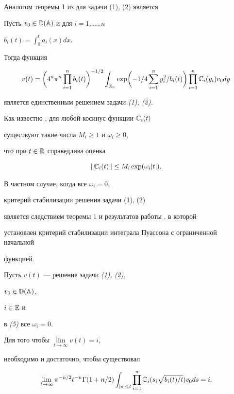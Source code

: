  


Аналогом теоремы 1 из \cite{G1} для задачи (1), (2) является 


 


\begin{thm} Пусть $v_0\in\Bbb D(\Bbb A)$ и для $i=1,\dotsc,n$\; 


$b_i(t)=\int^t_0a_i(x)dx$. 


Тогда функция 


\begin{equation} 


v(t)=\biggl(4^n\pi^n\prod^n_{i=1}b_i(t)\biggr)^{-1/2} 


\int_{\Bbb R_n}\exp\biggl(-1/4\sum^n_{i=1}y^2_i/b_i(t)\biggr) 


\prod^n_{i=1}\Bbb C_i(y_i)v_0dy 


\end{equation} 


является единственным решением задачи {\em (1), (2).} 


\end{thm} 


 


Как известно \cite{Vas}, для любой косинус-функции $\Bbb C_i(t)$ 


существуют такие числа $M_i\ge 1$ и $\omega_i\ge 0$, 


что при $t\in\Bbb R$ справедлива оценка 


\begin{equation} 


\|\Bbb C_i(t)\| \le M_i\exp(\omega_i|t|). 


\end{equation} 


 


В частном случае, когда все $\omega_i=0$,


критерий стабилизации решения задачи (1), (2) 


является следствием теоремы 1 и результатов работы \cite{Rep}, в которой 


установлен критерий стабилизации интеграла Пуассона с ограниченной начальной 


функцией. 


 


\begin{thm} Пусть $v(t)$ --- решение задачи {\em (1), (2),} 


$v_0\in\Bbb D(\Bbb A)$, 


$i\in\Bbb E$ и 


в {\em (5)} все $\omega_i=0$. 


Для того чтобы $\lim\limits_{t\to\infty}v(t)=i$, 


необходимо и достаточно, чтобы существовал 


$$ 


\lim_{t\to \infty}\pi^{-n/2}t^{-n}\Gamma(1+n/2) 


\int_{|s|\le t}\prod^n_{i=1}\Bbb C_i(s_i\sqrt{b_i(t)/t})v_0ds =i. 


$$ 


\end{thm} 


